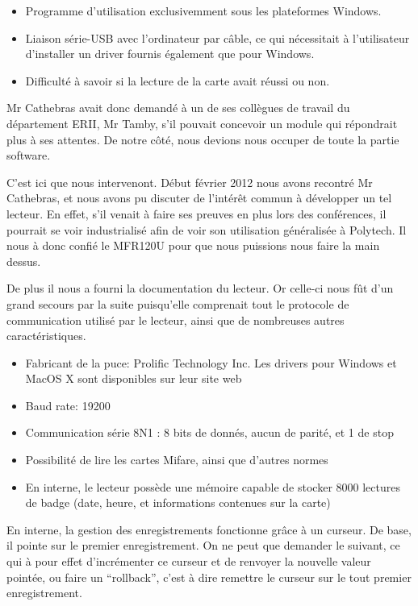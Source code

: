     \begin{itemize}
        \item Programme d'utilisation exclusivemment sous les plateformes Windows.
        \item Liaison série-USB avec l'ordinateur par câble, ce qui nécessitait 
              à l'utilisateur d'installer un driver fournis également que pour
              Windows.
        \item Difficulté à savoir si la lecture de la carte avait réussi ou non.
    \end{itemize}

Mr Cathebras avait donc demandé à un de ses collègues de travail du département
ERII, Mr Tamby, s'il pouvait concevoir un module qui répondrait plus à ses attentes.
De notre côté, nous devions nous occuper de toute la partie software.

C'est ici que nous intervenont. Début février 2012 nous avons recontré Mr Cathebras,
et nous avons pu discuter de l'intérêt commun à développer un tel lecteur. En effet,
s'il venait à faire ses preuves en plus lors des conférences, il pourrait se voir
industrialisé afin de voir son utilisation généralisée à Polytech. Il nous à donc
confié le MFR120U pour que nous puissions nous faire la main dessus.


De plus il nous a fourni la documentation du lecteur. Or celle-ci nous fût d'un
grand secours par la suite puisqu'elle comprenait tout le protocole de communication
utilisé par le lecteur, ainsi que de nombreuses autres caractéristiques.

    \begin{itemize}
    \item Fabricant de la puce: Prolific Technology Inc. Les drivers pour Windows
          et MacOS X sont disponibles sur leur site web \cite{prolific}
    \item Baud rate: 19200
    \item Communication série 8N1 : 8 bits de donnés, aucun de parité, et 1 de stop
    \item Possibilité de lire les cartes Mifare, ainsi que d'autres normes
    \item En interne, le lecteur possède une mémoire capable de stocker 8000
          lectures de badge (date, heure, et informations contenues sur la carte)
    \end{itemize}

En interne, la gestion des enregistrements fonctionne grâce à un curseur.
De base, il pointe sur le premier enregistrement. On ne peut que demander le suivant,
ce qui à pour effet d'incrémenter ce curseur et de renvoyer la nouvelle valeur
pointée, ou faire un ``rollback'', c'est à dire remettre le curseur sur le tout
premier enregistrement.

